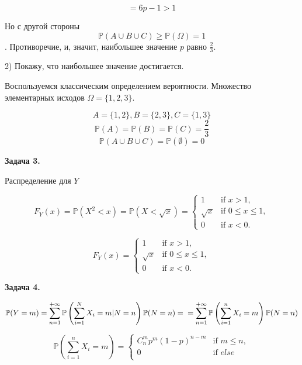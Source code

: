 \documentclass[12pt]{article}
\begin{document}
$$=6p -1  > 1$$

Но с другой стороны $$\mathbb{P}(A \cup B\cup C) \geq \mathbb{P}(\Omega) =1$$. Противоречие, и, значит, наибольшее значение $p$ равно $\frac{2}{3}$.

2) Покажу, что наибольшее значение достигается.

Воспользуемся классическим определением вероятности. Множество элементарных исходов $\Omega=\{1, 2, 3\}$. 

$$A = \{1, 2\}, B = \{2, 3\}, C = \{1, 3\}$$
$$\mathbb{P}(A) = \mathbb{P}(B) = \mathbb{P}(C) = \frac{2}{3}$$
$$\mathbb{P}(A\cup B \cup C)= \mathbb{P}(\emptyset)=0$$

\begin{center}
\textbf{Задача 3.}
\end{center}

Распределение для $Y$


\begin{equation*}
F_Y(x) = \mathbb{P}(X^2 < x) = \mathbb{P}(X < \sqrt{x}) = 
 \begin{cases}
   1 &\text{if  $x > 1,$}\\
   \sqrt{x} &\text{if  $0 \leq x \leq 1,$}\\
   0 &\text{if $x < 0.$}
 \end{cases}
\end{equation*}


\begin{equation*}
\boxed{F_Y(x) =
 \begin{cases}
   1 &\text{if  $x > 1,$}\\
   \sqrt{x} &\text{if  $0 \leq x \leq 1,$}\\
   0 &\text{if $x < 0.$}
 \end{cases}}
\end{equation*}

\begin{center}
\textbf{Задача 4.}
\end{center}


\begin{equation*}
\mathbb{P}(Y = m) = \sum\limits_{n=1}^{+\infty}\mathbb{P}\left(\sum\limits_{i=1}^NX_i = m|N=n\right)\mathbb{P}(N=n) = \\
=\sum\limits_{n=1}^{+\infty}\mathbb{P}\left(\sum\limits_{i=1}^nX_i = m\right)\mathbb{P}(N=n)
\end{equation*}

\begin{equation*}
\mathbb{P}\left(\sum\limits_{i=1}^nX_i = m\right) = 
\begin{cases}
C_n^m p^m(1-p)^{n-m} &\text{if  $m \leq n,$}\\
0 &\text{if  $else$}\\
\end{cases}
\end{equation*}
\end{document}
